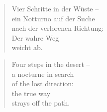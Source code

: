 \cleartoverso

\begin{verse}
Vier Schritte in der Wüste --\\
ein Notturno auf der Suche\\
nach der verlorenen Richtung:\\
Der wahre Weg\\
weicht ab.
\end{verse}

\cleartorecto

\begin{verse}
Four steps in the desert --\\
a nocturne in search\\
of the lost direction:\\
the true way\\
strays off the path.
\end{verse}

